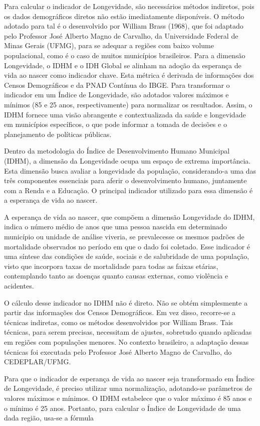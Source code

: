 \documentclass[
]{article}
\begin{document}
Para calcular o indicador de Longevidade, são necessários métodos
indiretos, pois os dados demográficos diretos não estão imediatamente
disponíveis. O método adotado para tal é o desenvolvido por William
Brass (1968), que foi adaptado pelo Professor José Alberto Magno de
Carvalho, da Universidade Federal de Minas Gerais (UFMG), para se
adequar a regiões com baixo volume populacional, como é o caso de muitos
municípios brasileiros. Para a dimensão Longevidade, o IDHM e o IDH
Global se alinham na adoção da esperança de vida ao nascer como
indicador chave. Esta métrica é derivada de informações dos Censos
Demográficos e da PNAD Contínua do IBGE. Para transformar o indicador em
um Índice de Longevidade, são adotados valores máximos e mínimos (85 e
25 anos, respectivamente) para normalizar os resultados. Assim, o IDHM
fornece uma visão abrangente e contextualizada da saúde e longevidade em
municípios específicos, o que pode informar a tomada de decisões e o
planejamento de políticas públicas.

Dentro da metodologia do Índice de Desenvolvimento Humano Municipal
(IDHM), a dimensão da Longevidade ocupa um espaço de extrema
importância. Esta dimensão busca avaliar a longevidade da população,
considerando-a uma das três componentes essenciais para aferir o
desenvolvimento humano, juntamente com a Renda e a Educação. O principal
indicador utilizado para essa dimensão é a esperança de vida ao nascer.

A esperança de vida ao nascer, que compõem a dimensão Longevidade do
IDHM, indica o número médio de anos que uma pessoa nascida em
determinado município ou unidade de análise viveria, se prevalecesse os
mesmos padrões de mortalidade observados no período em que o dado foi
coletado. Esse indicador é uma síntese das condições de saúde, sociais e
de salubridade de uma população, visto que incorpora taxas de
mortalidade para todas as faixas etárias, contemplando tanto as doenças
quanto causas externas, como violência e acidentes.

O cálculo desse indicador no IDHM não é direto. Não se obtém
simplesmente a partir das informações dos Censos Demográficos. Em vez
disso, recorre-se a técnicas indiretas, como os métodos desenvolvidos
por William Brass. Tais técnicas, para serem precisas, necessitam de
ajustes, sobretudo quando aplicadas em regiões com populações menores.
No contexto brasileiro, a adaptação dessas técnicas foi executada pelo
Professor José Alberto Magno de Carvalho, do CEDEPLAR/UFMG.

Para que o indicador de esperança de vida ao nascer seja transformado em
Índice de Longevidade, é preciso utilizar uma normalização, adotando-se
parâmetros de valores máximos e mínimos. O IDHM estabelece que o valor
máximo é 85 anos e o mínimo é 25 anos. Portanto, para calcular o Índice
de Longevidade de uma dada região, usa-se a fórmula
\end{document}
